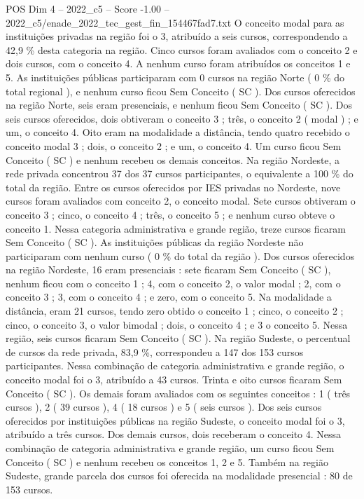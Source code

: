 \begin{textsample}{POS Dim 4 – 2022\_c5 – Score -1.00 – 2022\_c5/enade\_2022\_tec\_gest\_fin\_154467fad7.txt}
O conceito modal para as instituições privadas na região foi o 3, atribuído a seis cursos, correspondendo a 42,9 \% desta categoria na região.
Cinco cursos foram avaliados com o conceito 2 e dois cursos, com o conceito 4.
A nenhum curso foram atribuídos os conceitos 1 e 5.
As instituições públicas participaram com 0 cursos na região Norte ( 0 \% do total regional ), e nenhum curso ficou Sem Conceito ( SC ).
Dos cursos oferecidos na região Norte, seis eram presenciais, e nenhum ficou Sem Conceito ( SC ).
Dos seis cursos oferecidos, dois obtiveram o conceito 3 ; três, o conceito 2 ( modal ) ; e um, o conceito 4.
Oito eram na modalidade a distância, tendo quatro recebido o conceito modal 3 ; dois, o conceito 2 ; e um, o conceito 4.
Um curso ficou Sem Conceito ( SC ) e nenhum recebeu os demais conceitos.
Na região Nordeste, a rede privada concentrou 37 dos 37 cursos participantes, o equivalente a 100 \% do total da região.
Entre os cursos oferecidos por IES privadas no Nordeste, nove cursos foram avaliados com conceito 2, o conceito modal.
Sete cursos obtiveram o conceito 3 ; cinco, o conceito 4 ; três, o conceito 5 ; e nenhum curso obteve o conceito 1.
Nessa categoria administrativa e grande região, treze cursos ficaram Sem Conceito ( SC ).
As instituições públicas da região Nordeste não participaram com nenhum curso ( 0 \% do total da região ).
Dos cursos oferecidos na região Nordeste, 16 eram presenciais : sete ficaram Sem Conceito ( SC ), nenhum ficou com o conceito 1 ; 4, com o conceito 2, o valor modal ; 2, com o conceito 3 ; 3, com o conceito 4 ; e zero, com o conceito 5.
Na modalidade a distância, eram 21 cursos, tendo zero obtido o conceito 1 ; cinco, o conceito 2 ; cinco, o conceito 3, o valor bimodal ; dois, o conceito 4 ; e 3 o conceito 5.
Nessa região, seis cursos ficaram Sem Conceito ( SC ).
Na região Sudeste, o percentual de cursos da rede privada, 83,9 \%, correspondeu a 147 dos 153 cursos participantes.
Nessa combinação de categoria administrativa e grande região, o conceito modal foi o 3, atribuído a 43 cursos.
Trinta e oito cursos ficaram Sem Conceito ( SC ).
Os demais foram avaliados com os seguintes conceitos : 1 ( três cursos ), 2 ( 39 cursos ), 4 ( 18 cursos ) e 5 ( seis cursos ).
Dos seis cursos oferecidos por instituições públicas na região Sudeste, o conceito modal foi o 3, atribuído a três cursos.
Dos demais cursos, dois receberam o conceito 4.
Nessa combinação de categoria administrativa e grande região, um curso ficou Sem Conceito ( SC ) e nenhum recebeu os conceitos 1, 2 e 5.
Também na região Sudeste, grande parcela dos cursos foi oferecida na modalidade presencial : 80 de 153 cursos.

\end{textsample}
